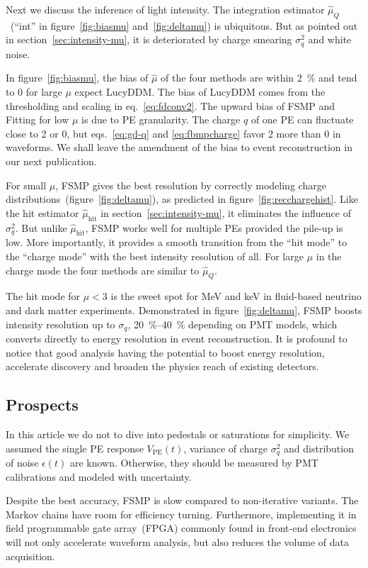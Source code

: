 Next we discuss the inference of light intensity.  The integration estimator $\hat{\mu}_Q$~(``int'' in figure~\ref{fig:biasmu} and~\ref{fig:deltamu}) is ubiquitous.  But as pointed out in section~\ref{sec:intensity-mu}, it is deteriorated by charge smearing $\sigma_q^2$ and white noise.

In figure~\ref{fig:biasmu}, the bias of $\hat{\mu}$ of the four methods are within \SI{2}{\percent} and tend to 0 for large $\mu$ expect LucyDDM.  The bias of LucyDDM comes from the thresholding and scaling in eq.~\eqref{eq:fdconv2}.  The upward bias of FSMP and Fitting for low $\mu$ is due to PE granularity.  The charge $q$ of one PE can fluctuate close to 2 or 0, but eqs.~\eqref{eq:gd-q} and \eqref{eq:fbmpcharge} favor 2 more than 0 in waveforms.  We shall leave the amendment of the bias to event reconstruction in our next publication.

For small $\mu$, FSMP gives the best resolution by correctly modeling charge distributions~(figure~\ref{fig:deltamu}), as predicted in figure~\ref{fig:recchargehist}.  Like the hit estimator $\hat{\mu}_\mathrm{hit}$ in section~\ref{sec:intensity-mu}, it eliminates the influence of $\sigma_q^2$. But unlike $\hat{\mu}_\mathrm{hit}$, FSMP works well for multiple PEs provided the pile-up is low.  More importantly, it provides a smooth transition from the ``hit mode'' to the ``charge mode'' with the best intensity resolution of all.  For large $\mu$ in the charge mode the four methods are similar to $\hat{\mu}_Q$.

The hit mode for $\mu < 3$ is the sweet spot for \si{MeV} and \si{keV} in fluid-based neutrino and dark matter experiments.  Demonstrated in figure~\ref{fig:deltamu}, FSMP boosts intensity resolution up to $\sigma_q$, \SIrange{20}{40}{\percent} depending on PMT models, which converts directly to energy resolution in event reconstruction.  It is profound to notice that good analysis having the potential to boost energy resolution, accelerate discovery and broaden the physics reach of existing detectors. 


\subsection{Prospects}
\label{sec:prospects}

In this article we do not to dive into pedestals or saturations for simplicity.  We assumed the single PE response $V_\mathrm{PE}(t)$, variance of charge $\sigma_q^2$ and distribution of noise $\epsilon(t)$ are known.  Otherwise, they should be measured by PMT calibrations and modeled with uncertainty.

Despite the best accuracy, FSMP is slow compared to non-iterative variants.  The Markov chains have room for efficiency turning.  Furthermore, implementing it in field programmable gate array~(FPGA) commonly found in front-end electronics will not only accelerate waveform analysis, but also reduces the volume of data acquisition.
